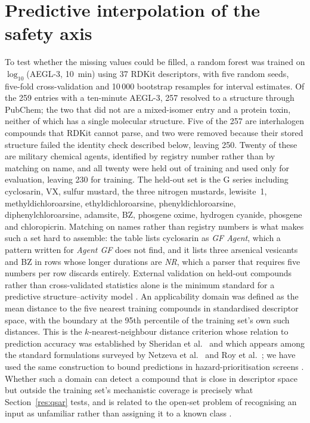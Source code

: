 \documentclass[11pt,a4paper]{article}
\begin{document}
\section{Predictive interpolation of the safety axis}
\label{sec:qsar}
To test whether the missing values could be filled, a random forest was trained
on $\log_{10}$(AEGL-3, 10~min) using 37 RDKit descriptors, with five random seeds,
five-fold cross-validation and 10\,000 bootstrap resamples for interval
estimates. Of the 259 entries with a ten-minute AEGL-3, 257 resolved to a
structure through PubChem; the two that did not are a mixed-isomer entry and a
protein toxin, neither of which has a single molecular structure. Five of the 257
are interhalogen compounds that RDKit cannot parse, and two were removed because
their stored structure failed the identity check described below, leaving 250.
Twenty of these are military chemical agents, identified by registry number
rather than by matching on name, and all twenty were held out of training and
used only for evaluation, leaving 230 for training. The held-out set is the G
series including cyclosarin, VX, sulfur mustard, the three nitrogen mustards,
lewisite~1, methyldichloroarsine, ethyldichloroarsine, phenyldichloroarsine,
diphenylchloroarsine, adamsite, BZ, phosgene oxime, hydrogen cyanide, phosgene
and chloropicrin. Matching on names rather than registry numbers is what makes
such a set hard to assemble: the table lists cyclosarin as \textit{GF Agent}, which a
pattern written for \textit{Agent GF} does not find, and it lists three arsenical
vesicants and BZ in rows whose longer durations are \textit{NR}, which a parser
that requires five numbers per row discards entirely. External validation on
held-out compounds rather than cross-validated statistics
alone is the minimum standard for a predictive structure--activity model
\cite{gramatica2007,tropsha2010}. An applicability domain was defined as the
mean distance to the five nearest training compounds in standardised descriptor
space, with the boundary at the 95th percentile of the training set's own such
distances. This is the $k$-nearest-neighbour distance criterion whose relation to
prediction accuracy was established by Sheridan et al.~\cite{sheridan2004} and which appears
among the standard formulations surveyed by Netzeva et al.~\cite{netzeva2005} and
Roy et al.~\cite{roy2015}; we have used the same construction to bound predictions in
hazard-prioritisation screens \cite{dbpcarto}. Whether such a domain can detect
a compound that is close in descriptor space but outside the training set's
mechanistic coverage is precisely what Section~\ref{res:qsar} tests, and is
related to the open-set problem of recognising an input as unfamiliar rather than
assigning it to a known class \cite{openset}.
\end{document}
